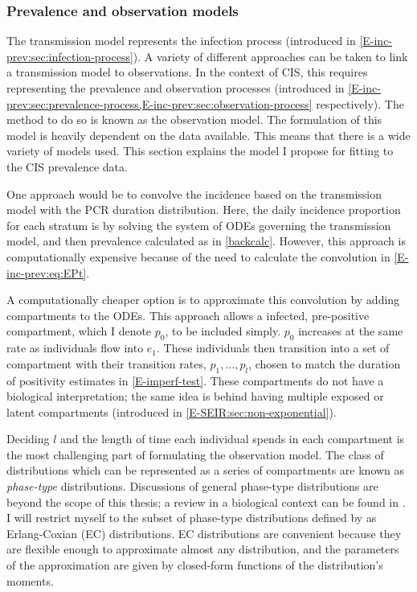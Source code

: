 \documentclass[thesis.tex]{subfiles}
\begin{document}
\subsubsection{Prevalence and observation models} \label{SEIR:sec:observation}


The transmission model represents the infection process (introduced in \cref{E-inc-prev:sec:infection-process}).
A variety of different approaches can be taken to link a transmission model to observations.
In the context of CIS, this requires representing the prevalence and observation processes (introduced in \cref{E-inc-prev:sec:prevalence-process,E-inc-prev:sec:observation-process} respectively).
The method to do so is known as the observation model.
The formulation of this model is heavily dependent on the data available.
This means that there is a wide variety of models used.
This section  explains the model I propose for fitting to the CIS prevalence data.

One approach would be to convolve the incidence based on the transmission model with the PCR duration distribution.
Here, the daily incidence proportion for each stratum is by solving the system of ODEs governing the transmission model, and then prevalence calculated as in \cref{backcalc}.
However, this approach is computationally expensive because of the need to calculate the convolution in \cref{E-inc-prev:eq:EPt}.

A computationally cheaper option is to approximate this convolution by adding compartments to the ODEs.
This approach allows a infected, pre-positive compartment, which I denote $p_0$, to be included simply.
$p_0$ increases at the same rate as individuals flow into $e_1$.
These individuals then transition into a set of compartment with their transition rates, $p_1, \dots, p_l$, chosen to match the duration of positivity estimates in \cref{E-imperf-test}.
These compartments do not have a biological interpretation; the same idea is behind having multiple exposed or latent compartments (introduced in \cref{E-SEIR:sec:non-exponential}).

Deciding $l$ and the length of time each individual spends in each compartment is the most challenging part of formulating the observation model.
The class of distributions which can be represented as a series of compartments are known as \emph{phase-type} distributions.
Discussions of general phase-type distributions are beyond the scope of this thesis; a review in a biological context can be found in \textcite{hobolthPhasetype}.
I will restrict myself to the subset of phase-type distributions defined by \textcite{osogamiClosed} as Erlang-Coxian (EC) distributions.
EC distributions are convenient because they are flexible enough to approximate almost any distribution, and the parameters of the approximation are given by closed-form functions of the distribution's moments.
\end{document}
